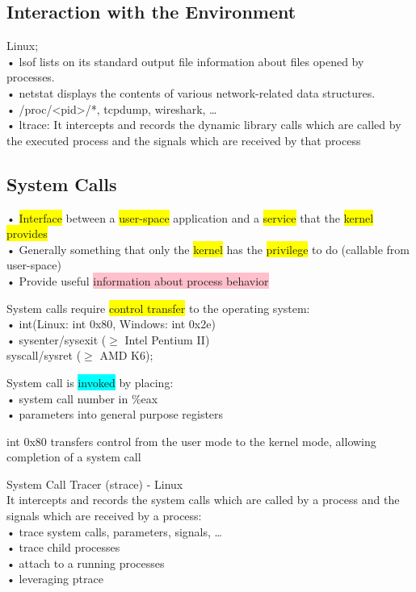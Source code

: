 \documentclass[]{project_plan}
\begin{document}
\subsection{Interaction with the Environment}

Linux;\\
• lsof lists on its standard output file information about files opened by
processes.\\
• netstat displays the contents of various network-related data structures.\\
• /proc/<pid>/*, tcpdump, wireshark, …\\
• ltrace: It intercepts and records the dynamic library calls which are called
by the executed process and the signals which are received by that process

\subsection{System Calls}

• \colorbox{yellow}{Interface} between a \colorbox{yellow}{user-space} application and a \colorbox{yellow}{service} that the \colorbox{yellow}{kernel
  provides}\\
• Generally something that only the \colorbox{yellow}{kernel} has the \colorbox{yellow}{privilege} to do (callable
from user-space)\\
• Provide useful \colorbox{pink}{information about process behavior}

System calls require \colorbox{yellow}{control transfer} to the operating system:\\
• int(Linux: int 0x80, Windows: int 0x2e)\\
• sysenter/sysexit ($\ge$ Intel Pentium II)\\
syscall/sysret ($\ge$ AMD K6);

System call is \colorbox{cyan}{invoked} by placing:\\
• system call number in \%eax\\
• parameters into general purpose registers

int 0x80 transfers control from the user mode to the kernel mode, allowing completion of a system call

System Call Tracer (strace) - Linux\\
It intercepts and records the system calls which are called by a process and the signals
which are received by a process:\\
• trace system calls, parameters, signals, …\\
• trace child processes\\
• attach to a running processes\\
• leveraging ptrace
\end{document}
